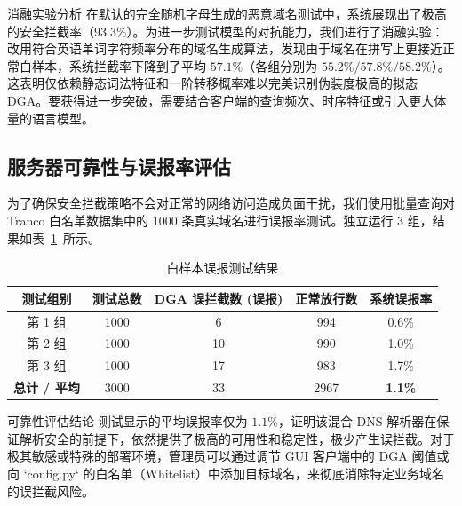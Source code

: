 \documentclass[11pt,a4paper]{ctexart}
\begin{document}
\begin{notebox}{消融实验分析}
在默认的完全随机字母生成的恶意域名测试中，系统展现出了极高的安全拦截率（$93.3\%$）。为进一步测试模型的对抗能力，我们进行了消融实验：改用符合英语单词字符频率分布的域名生成算法，发现由于域名在拼写上更接近正常白样本，系统拦截率下降到了平均 $57.1\%$（各组分别为 $55.2\% / 57.8\% / 58.2\%$）。这表明仅依赖静态词法特征和一阶转移概率难以完美识别伪装度极高的拟态 DGA。要获得进一步突破，需要结合客户端的查询频次、时序特征或引入更大体量的语言模型。
\end{notebox}

\subsection{服务器可靠性与误报率评估}
为了确保安全拦截策略不会对正常的网络访问造成负面干扰，我们使用批量查询对 Tranco 白名单数据集中的 1000 条真实域名进行误报率测试。独立运行 3 组，结果如表~\ref{tab:whitelist_fpr}~所示。

\begin{table}[H]
    \centering
    \color{Charcoal}
    \caption{白样本误报测试结果}
    \vspace{0.2cm}
    \begin{tabular}{ccccc}
        \toprule
        \textbf{测试组别} & \textbf{测试总数} & \textbf{DGA 误拦截数 (误报)} & \textbf{正常放行数} & \textbf{系统误报率} \\
        \midrule
        第 1 组 & 1000 & 6 & 994 & 0.6\% \\
        第 2 组 & 1000 & 10 & 990 & 1.0\% \\
        第 3 组 & 1000 & 17 & 983 & 1.7\% \\
        \midrule
        \textbf{总计 / 平均} & 3000 & 33 & 2967 & \textbf{1.1\%} \\
        \bottomrule
    \end{tabular}
    \label{tab:whitelist_fpr}
\end{table}

\begin{notebox}{可靠性评估结论}
测试显示的平均误报率仅为 $1.1\%$，证明该混合 DNS 解析器在保证解析安全的前提下，依然提供了极高的可用性和稳定性，极少产生误拦截。对于极其敏感或特殊的部署环境，管理员可以通过调节 GUI 客户端中的 DGA 阈值或向 `config.py` 的白名单（Whitelist）中添加目标域名，来彻底消除特定业务域名的误拦截风险。
\end{notebox}

\newpage

\end{document}
